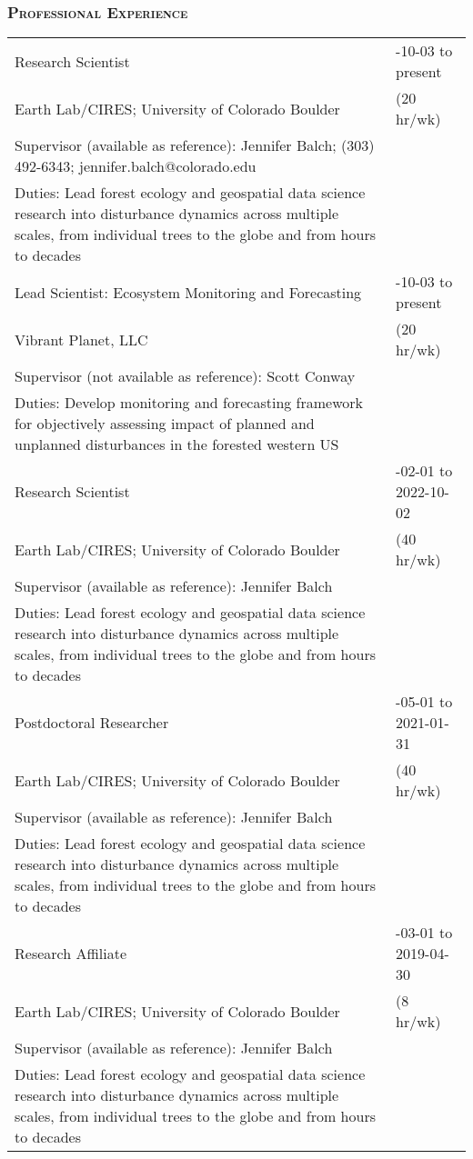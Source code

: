 \documentclass[10pt,english]{article}
\providecommand{\tabularnewline}{\\}
\begin{document}
\subsubsection*{\textsc{Professional Experience}}
\vspace{-0.5ex}

\renewcommand{\arraystretch}{1.2}
\begin{tabularx}{\textwidth}{@{}>{\raggedright}p{4.5in} >{\raggedleft}X@{}}

Research Scientist & 2022-10-03 to present \tabularnewline
\addtolength{\leftskip}{5ex}Earth Lab/CIRES; University of Colorado Boulder & (20 hr/wk) \tabularnewline
\addtolength{\leftskip}{5ex}Supervisor (available as reference): Jennifer Balch; (303) 492-6343; jennifer.balch@colorado.edu & \tabularnewline
\addtolength{\leftskip}{5ex}Duties: Lead forest ecology and geospatial data science research into disturbance dynamics across multiple scales, from individual trees to the globe and from hours to decades  & \tabularnewline

Lead Scientist: Ecosystem Monitoring and Forecasting & 2022-10-03 to present \tabularnewline
\addtolength{\leftskip}{5ex}Vibrant Planet, LLC & (20 hr/wk) \tabularnewline
\addtolength{\leftskip}{5ex}Supervisor (not available as reference): Scott Conway & \tabularnewline
\addtolength{\leftskip}{5ex}Duties: Develop monitoring and forecasting framework for objectively assessing impact of planned and unplanned disturbances in the forested western US & \tabularnewline

Research Scientist & 2021-02-01 to 2022-10-02 \tabularnewline
\addtolength{\leftskip}{5ex}Earth Lab/CIRES; University of Colorado Boulder & (40 hr/wk) \tabularnewline
\addtolength{\leftskip}{5ex}Supervisor (available as reference): Jennifer Balch & \tabularnewline
\addtolength{\leftskip}{5ex}Duties: Lead forest ecology and geospatial data science research into disturbance dynamics across multiple scales, from individual trees to the globe and from hours to decades  & \tabularnewline

Postdoctoral Researcher & 2019-05-01 to 2021-01-31 \tabularnewline
\addtolength{\leftskip}{5ex}Earth Lab/CIRES; University of Colorado Boulder & (40 hr/wk) \tabularnewline
\addtolength{\leftskip}{5ex}Supervisor (available as reference): Jennifer Balch & \tabularnewline
\addtolength{\leftskip}{5ex}Duties: Lead forest ecology and geospatial data science research into disturbance dynamics across multiple scales, from individual trees to the globe and from hours to decades  & \tabularnewline

Research Affiliate & 2019-03-01 to 2019-04-30 \tabularnewline
\addtolength{\leftskip}{5ex}Earth Lab/CIRES; University of Colorado Boulder & (8 hr/wk) \tabularnewline
\addtolength{\leftskip}{5ex}Supervisor (available as reference): Jennifer Balch & \tabularnewline
\addtolength{\leftskip}{5ex}Duties: Lead forest ecology and geospatial data science research into disturbance dynamics across multiple scales, from individual trees to the globe and from hours to decades  & \tabularnewline

\end{tabularx}
\end{document}
